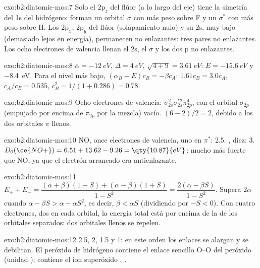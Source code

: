 \begin{solution}{exo:b2:diatomic-mos:7}
Solo el $2\mathrm p_z$ del flúor (a lo largo del eje) tiene la simetría del 1s del hidrógeno:
forman un orbital $\sigma$ con más peso sobre F y un $\sigma^*$ con más peso sobre H. Los
$2\mathrm p_x$, $2\mathrm p_y$ del flúor (solapamiento nulo) y su 2s, muy bajo (demasiado lejos en energía),
permanecen no enlazantes: tres pares no enlazantes. Los ocho electrones de valencia llenan el 2s, el $\sigma$
y los dos p no enlazantes.
\end{solution}

\begin{solution}{exo:b2:diatomic-mos:8}
$\bar\alpha = \qty{-12}{eV}$, $\Delta = \qty{4}{eV}$, $\sqrt{4 + 9} = \qty{3.61}{eV}$:
$E = \qty{-15.6}{eV}$ y \qty{-8.4}{eV}. Para el nivel más bajo, $(\alpha_B - E)c_B = -\beta
c_A$: $1.61c_B = 3.0c_A$, $c_A/c_B = 0.535$, $c_B^2 = 1/(1 + 0.286) = 0.78$.
\end{solution}

\begin{solution}{exo:b2:diatomic-mos:9}
Ocho electrones de valencia: $\sigma_{2s}^2\sigma_{2s}^{*2}\pi_{2p}^4$, con el orbital $\sigma_{2p}$
(empujado por encima de $\pi_{2p}$ por la mezcla) vacío.  $(6 - 2)/2 = 2$, debido a los
dos orbitales $\pi$ llenos.
\end{solution}

\begin{solution}{exo:b2:diatomic-mos:10}
NO, once electrones de valencia, uno en $\pi^*$:  2.5. , diez: 
3. $D_0(\ce{NO+}) = 6.51 + 13.62 - 9.26 = \qty{10.87}{eV}$: mucho más fuerte que NO, ya que
el electrón arrancado era antienlazante.
\end{solution}

\begin{solution}{exo:b2:diatomic-mos:11}
$E_+ + E_- = \dfrac{(\alpha + \beta)(1 - S) + (\alpha - \beta)(1 + S)}{1 - S^2} = \dfrac{2(\alpha -
\beta S)}{1 - S^2}$. Supera $2\alpha$ cuando $\alpha - \beta S > \alpha - \alpha S^2$, es decir,
$\beta < \alpha S$ (dividiendo por $-S < 0$). Con cuatro electrones, dos en cada orbital, la
energía total está por encima de la de los orbitales separados: dos orbitales llenos se repelen.
\end{solution}

\begin{solution}{exo:b2:diatomic-mos:12}
 2.5, 2, 1.5 y 1: en este orden los enlaces se alargan y se debilitan. El peróxido
de hidrógeno contiene el enlace sencillo O--O del peróxido (unidad );  contiene
el ion superóxido , .
\end{solution}

